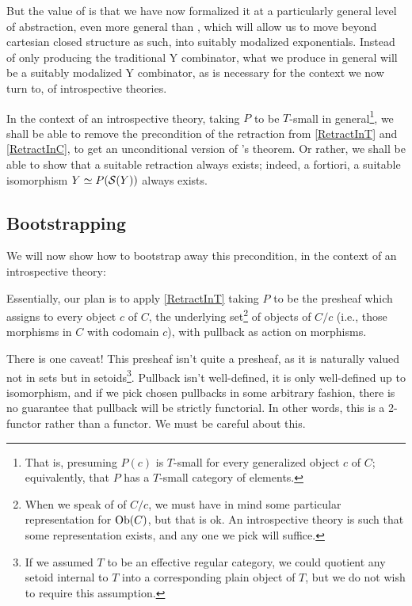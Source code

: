 But the value of  is that we have now formalized it at a particularly general level of abstraction, even more general than , which will allow us to move beyond cartesian closed structure as such, into suitably modalized exponentials. Instead of only producing the traditional Y combinator, what we produce in general will be a suitably modalized Y combinator, as is necessary for the context we now turn to, of introspective theories.

In the context of an introspective theory, taking $P$ to be $T$-small in general\footnote{That is, presuming $P(c)$ is $T$-small for every generalized object $c$ of $C$; equivalently, that $P$ has a $T$-small category of elements.}, we shall be able to remove the precondition of the retraction from \cref{RetractInT} and \cref{RetractInC}, to get an unconditional version of \Loeb's theorem. Or rather, we shall be able to show that a suitable retraction always exists; indeed, a fortiori, a suitable isomorphism $Y \simeq P(\mathcal{S}(Y))$ always exists.

\subsection{Bootstrapping}
We will now show how to bootstrap away this precondition, in the context of an introspective theory:

Essentially, our plan is to apply \cref{RetractInT} taking $P$ to be the presheaf which assigns to every object $c$ of $C$, the underlying set\footnote{When we speak of  of $C/c$, we must have in mind some particular representation for $\operatorname{Ob}(C)$, but that is ok. An introspective theory is such that some representation exists, and any one we pick will suffice.} of objects of $C/c$ (i.e., those morphisms in $C$ with codomain $c$), with pullback as action on morphisms.

There is one caveat! This presheaf isn't quite a presheaf, as it is naturally valued not in sets but in setoids\footnote{If we assumed $T$ to be an effective regular category, we could quotient any setoid internal to $T$ into a corresponding plain object of $T$, but we do not wish to require this assumption.}. Pullback isn't well-defined, it is only well-defined up to isomorphism, and if we pick chosen pullbacks in some arbitrary fashion, there is no guarantee that pullback will be strictly functorial. In other words, this is a 2-functor rather than a functor. We must be careful about this.

